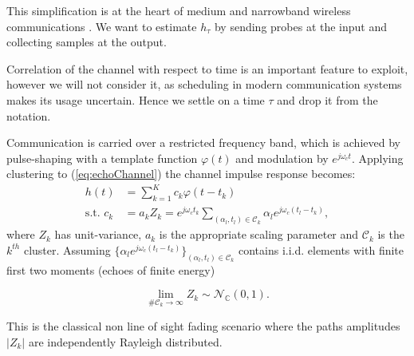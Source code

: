 \documentclass[journal,10pt]{IEEEtran}
\begin{document}
	This simplification is at the heart of medium and narrowband wireless communications \cite{Molisch2005}. We want to estimate $h_\tau$ by sending probes at the input and collecting samples at the output.
	
	 Correlation of the channel with respect to time is an important feature to exploit, however we will not consider it, as scheduling in modern communication systems makes its usage uncertain. Hence we settle on a time $\tau$ and drop it from the notation.
	 
	 Communication is carried over a restricted frequency band, which is achieved by pulse-shaping with a template function $\varphi(t)$ and modulation by $e^{j\omega_c t}$. Applying clustering to (\ref{eq:echoChannel}) the channel impulse response becomes:
	 \begin{align}
	 h(t)&=\sum_{k=1}^K c_k\varphi(t-t_k)\label{eq:mpchannel}\\
	 \text{s.t. }c_k&=a_kZ_k= e^{j\omega_c t_k}\sum_{(\alpha_l,t_l)\in\mathcal{C}_k}\alpha_le^{j\omega_c(t_l-t_k)},
	 \end{align}
	 where $Z_k$ has unit-variance, $a_k$ is the appropriate scaling parameter and $\mathcal{C}_k$ is the $k^{th}$ cluster. Assuming $\lbrace \alpha_l e^{j\omega_c(t_l-t_k)}\rbrace_{(\alpha_l,t_l)\in\mathcal{C}_k}$ contains i.i.d. elements with finite first two moments (echoes of finite energy)
	 
	 $$\lim_{\#\mathcal{C}_k\rightarrow\infty} Z_k \sim \mathcal{N}_{\mathbb C}(0,1).$$
	 
	 This is the classical non line of sight fading scenario where the paths amplitudes $|Z_k|$ are independently Rayleigh distributed.
\end{document}
